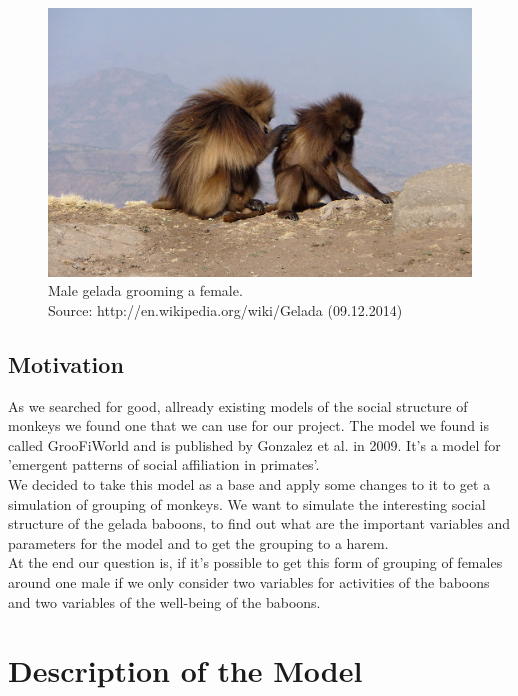 \documentclass[11pt]{article}
\begin{document}
\begin{figure}[H]
\centering
\includegraphics[scale=0.35]{Photos/Dzelady}
\caption[Male gelada grooming a female]{Male gelada grooming a female.\\
Source: http://en.wikipedia.org/wiki/Gelada (09.12.2014)}
\label{fig:Grooming}
\end{figure}

\subsection{Motivation}
\label{sec:Motivation}
As we searched for good, allready existing models of the social structure of monkeys we found one that we can use for our project. The model we found is called GrooFiWorld and is published by Gonzalez et al. in 2009.\cite{Puga-Gonzalez2009} It's a model for 'emergent patterns of social affiliation in primates'.\cite{Puga-Gonzalez2009}
\\
We decided to take this model as a base and apply some changes to it to get a simulation of grouping of monkeys. We want to simulate the interesting social structure of the gelada baboons, to find out what are the important variables and parameters for the model and to get the grouping to a harem.\\
At the end our question is, if it's possible to get this form of grouping of females around one male if we only consider two variables for activities of the baboons and two variables of the well-being of the baboons.




\section{Description of the Model}
\end{document}
